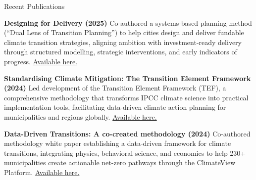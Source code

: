 \documentclass{resume} %
\begin{document}

\begin{rSection}{Recent Publications}
  \vspace{-1.25em}
\item \textbf{Designing for Delivery (2025)} {Co-authored a systems-based planning method (``Dual Lens of Transition Planning'') to help cities design and deliver fundable climate transition strategies, aligning ambition with investment-ready delivery through structured modelling, strategic interventions, and early indicators of progress. \href{https://github.com/nitwit-se/cv/blob/483d08a24a34cda01947c78a499fb4de7522bb14/publications/Designing%20for%20Delivery%2020250630.pdf}{Available here.}}

\item \textbf{Standardising Climate Mitigation: The Transition Element Framework (2024)} {Led development of the Transition Element Framework (TEF), a comprehensive methodology that transforms IPCC climate science into practical implementation tools, facilitating data-driven climate action planning for municipalities and regions globally. \href{https://github.com/nitwit-se/cv/blob/483d08a24a34cda01947c78a499fb4de7522bb14/publications/The_Transition_Element_Framework_White_paper_ENG_v5.pdf}{Available here.}}
\item \textbf{Data-Driven Transitions: A co-created methodology (2024)} {Co-authored methodology white paper establishing a data-driven framework for climate transitions, integrating physics, behavioral science, and economics to help 230+ municipalities create actionable net-zero pathways through the ClimateView Platform. \href{https://github.com/nitwit-se/cv/blob/483d08a24a34cda01947c78a499fb4de7522bb14/publications/Data-driven_Transitions_Revised_Edition_White_paper_ENG_v3.pdf}{Available here.}
}
\end{rSection} 
\end{document}
